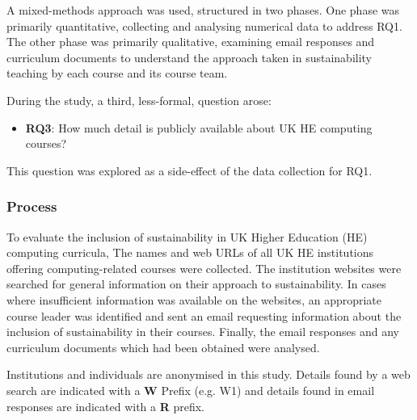 A mixed-methods approach was used, structured in two phases. One phase was primarily quantitative, collecting and analysing numerical data to address RQ1. The other phase was primarily qualitative, examining email responses and curriculum documents to understand the approach taken in sustainability teaching by each course and its course team.

During the study, a third, less-formal, question arose: 
\begin{itemize}
\item \textbf{RQ3}: How much detail is publicly available about UK HE computing courses?
\end{itemize}
This question was explored as a side-effect of the data collection for RQ1.

\subsubsection*{Process}

To evaluate the inclusion of sustainability in UK Higher Education (HE) computing curricula, The names and web URLs of all UK HE institutions offering computing-related courses were collected. The institution websites were searched for general information on their approach to sustainability. In cases where insufficient information was available on the websites, an appropriate course leader was identified and sent an email requesting information about the inclusion of sustainability in their courses. Finally, the email responses and any curriculum documents which had been obtained were analysed.

Institutions and individuals are anonymised in this study. Details found by a web search are indicated with a \textbf{W} Prefix (e.g. W1) and details found in email responses are indicated with a \textbf{R} prefix.

